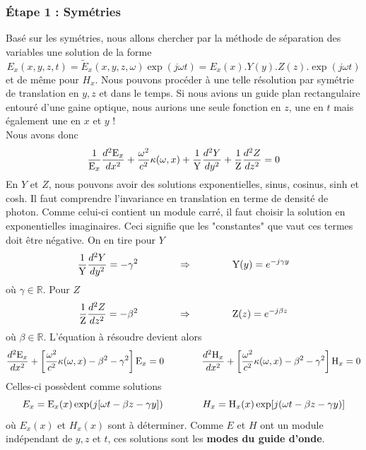 \subsubsection{Étape 1 : Symétries}
Basé sur les symétries, nous allons chercher par la méthode de séparation des variables une solution
de la forme
\begin{equation}
{E_x}(x,y,z,t) = {\tilde E_x}(x,y,z,\omega )\exp (j\omega t) = {E_x}(x).Y(y).Z(z).\exp (j\omega t)
\end{equation}
et de même pour $H_x$. Nous pouvons procéder à une telle résolution par symétrie de translation en $y,
z$ et dans le temps. Si nous avions un guide plan rectangulaire entouré d'une gaine optique, nous
aurions une seule fonction en $z$, une en $t$ mais également une en $x$ et $y$ ! \\

Nous avons donc
\begin{equation}
\frac{1}{{{{\rm{E}}_x}}}\frac{{{d^2}{{\rm{E}}_x}}}{{d{x^2}}} + \frac{{{\omega ^2}}}{{{c^2}}}\kappa (\omega ,x) + \frac{1}{{\rm{Y}}}\frac{{{d^2}Y}}{{d{y^2}}} + \frac{1}{{\rm{Z}}}\frac{{{d^2}Z}}{{d{z^2}}} = 0
\end{equation}
En $Y$ et $Z$, nous pouvons avoir des solutions exponentielles, sinus, cosinus, sinh et cosh. Il faut
comprendre l'invariance en translation en terme de densité de photon. Comme celui-ci contient un 
module carré, il faut choisir la solution en exponentielles imaginaires. Ceci signifie que les 
"constantes" que vaut ces termes doit être négative. On en tire pour $Y$
\begin{equation}
\frac{1}{{\rm{Y}}}\frac{{{d^2}Y}}{{d{y^2}}} =  - {\gamma ^2}\qquad\qquad\Rightarrow\qquad\qquad
{\rm{Y(}}y{\rm{)}} = {e^{ - j\gamma y}}
\end{equation}
où $\gamma\in\mathbb{R}$. Pour $Z$
\begin{equation}
\frac{1}{{\rm{Z}}}\frac{{{d^2}Z}}{{d{z^2}}} =  - {\beta ^2} \qquad\qquad\Rightarrow\qquad\qquad
{\rm{Z(}}z{\rm{)}} = {e^{ - j\beta z}}
\end{equation}
où $\beta\in\mathbb{R}$. L'équation à résoudre devient alors
\begin{equation}
\frac{{{d^2}{{\rm{E}}_x}}}{{d{x^2}}} + \left[ {\frac{{{\omega ^2}}}{{{c^2}}}\kappa (\omega ,x) - {\beta ^2} - {\gamma ^2}} \right]{{\rm{E}}_x} = 0\qquad\qquad
\frac{{{d^2}{{\rm{H}}_x}}}{{d{x^2}}} + \left[ {\frac{{{\omega ^2}}}{{{c^2}}}\kappa (\omega ,x) - {\beta ^2} - {\gamma ^2}} \right]{{\rm{H}}_x} = 0
\end{equation}
Celles-ci possèdent comme solutions
\begin{equation}
{E_x} = {{\rm{E}}_x}(x)\exp (j[\omega t - \beta z - \gamma y])\qquad\qquad
{H_x} = {{\rm{H}}_x}(x)\exp [j(\omega t - \beta z - \gamma y)]
\end{equation}
où $E_x(x)$ et $H_x(x)$ sont à déterminer. Comme $E$ et $H$ ont un module indépendant de $y,z$ et 
$t$, ces solutions sont les \textbf{modes du guide d'onde}.\\

